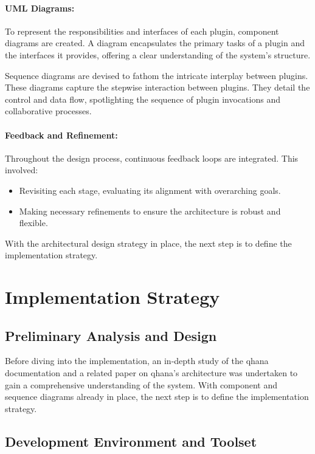 \documentclass[
  a4paper,  %
  twoside,  %
  bibliography=totoc,
  headsepline,
  cleardoublepage=empty,
  parskip=half,
  draft=false
]{scrbook}
\begin{document}
\paragraph{UML Diagrams:}
To represent the responsibilities and interfaces of each plugin, component diagrams are created.
A diagram encapsulates the primary tasks of a plugin and the interfaces it provides, offering a clear understanding of the system's structure.

Sequence diagrams are devised to fathom the intricate interplay between plugins.
These diagrams capture the stepwise interaction between plugins.
They detail the control and data flow, spotlighting the sequence of plugin invocations and collaborative processes.


\paragraph{Feedback and Refinement:}
Throughout the design process, continuous feedback loops are integrated. This involved:
\begin{itemize}
\item Revisiting each stage, evaluating its alignment with overarching goals.
\item Making necessary refinements to ensure the architecture is robust and flexible.
\end{itemize}

With the architectural design strategy in place, the next step is to define the implementation strategy.

\section{Implementation Strategy}
\label{sec:implementationStrategy}

\subsection{Preliminary Analysis and Design}
Before diving into the implementation, an in-depth study of the \gls{qhana} documentation \cite{FabianBuehler} and a related paper on \gls{qhana}'s architecture \cite{Buehler2022} was undertaken to gain a comprehensive understanding of the system.
With component and sequence diagrams already in place, the next step is to define the implementation strategy.

\subsection{Development Environment and Toolset}
\end{document}
